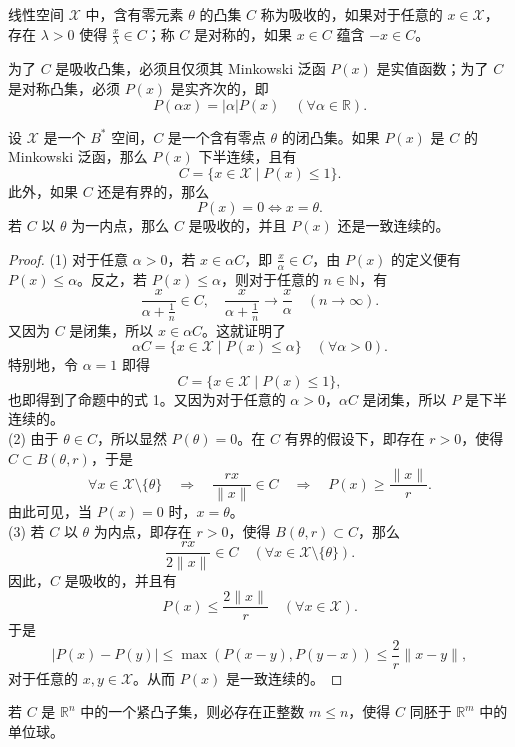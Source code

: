 \documentclass[lang=cn,newtx,10pt,scheme=chinese,thmcnt=chapter]{elegantbook}
\begin{document}
\begin{definition}
线性空间 $\mathscr{X}$ 中，含有零元素 $\theta$ 的凸集 $C$ 称为吸收的，如果对于任意的 $x \in \mathscr{X}$，存在 $\lambda > 0$ 使得 $\frac{x}{\lambda} \in C$；称 $C$ 是对称的，如果 $x \in C$ 蕴含 $-x \in C$。
\end{definition}

\begin{proposition}
为了 $C$ 是吸收凸集，必须且仅须其 Minkowski 泛函 $P(x)$ 是实值函数；为了 $C$ 是对称凸集，必须 $P(x)$ 是实齐次的，即
\[
P(\alpha x) = |\alpha| P(x) \quad (\forall \alpha \in \mathbb{R}).
\]
\end{proposition}
\begin{proposition}
设 $\mathscr{X}$ 是一个 $B^*$ 空间，$C$ 是一个含有零点 $\theta$ 的闭凸集。如果 $P(x)$ 是 $C$ 的 Minkowski 泛函，那么 $P(x)$ 下半连续，且有
\[
C = \{x \in \mathscr{X} \mid P(x) \leqslant 1\}.
\]
此外，如果 $C$ 还是有界的，那么
\[
P(x) = 0 \Longleftrightarrow x = \theta.
\]
若 $C$ 以 $\theta$ 为一内点，那么 $C$ 是吸收的，并且 $P(x)$ 还是一致连续的。
\end{proposition}

\begin{proof}
(1) 对于任意 $\alpha > 0$，若 $x \in \alpha C$，即 $\frac{x}{\alpha} \in C$，由 $P(x)$ 的定义便有 $P(x) \leqslant \alpha$。反之，若 $P(x) \leqslant \alpha$，则对于任意的 $n \in \mathbb{N}$，有
\[
\frac{x}{\alpha + \frac{1}{n}} \in C, \quad \frac{x}{\alpha + \frac{1}{n}} \rightarrow \frac{x}{\alpha} \quad (n \rightarrow \infty).
\]
又因为 $C$ 是闭集，所以 $x \in \alpha C$。这就证明了
\[
\alpha C = \{x \in \mathscr{X} \mid P(x) \leqslant \alpha\} \quad (\forall \alpha > 0).
\]
特别地，令 $\alpha = 1$ 即得
\[
C = \{x \in \mathscr{X} \mid P(x) \leqslant 1\},
\]
也即得到了命题中的式 1。又因为对于任意的 $\alpha > 0$，$\alpha C$ 是闭集，所以 $P$ 是下半连续的。\\
(2) 由于 $\theta \in C$，所以显然 $P(\theta) = 0$。在 $C$ 有界的假设下，即存在 $r > 0$，使得 $C \subset B(\theta, r)$，于是
\[
\forall x \in \mathscr{X} \setminus \{\theta\} \quad \Rightarrow \quad \frac{r x}{\|x\|} \in C \quad \Rightarrow \quad P(x) \geqslant \frac{\|x\|}{r}.
\]
由此可见，当 $P(x) = 0$ 时，$x = \theta$。\\
(3) 若 $C$ 以 $\theta$ 为内点，即存在 $r > 0$，使得 $B(\theta, r) \subset C$，那么
\[
\frac{r x}{2 \|x\|} \in C \quad (\forall x \in \mathscr{X} \setminus \{\theta\}).
\]
因此，$C$ 是吸收的，并且有
\[
P(x) \leqslant \frac{2 \|x\|}{r} \quad (\forall x \in \mathscr{X}).
\]
于是
\[
|P(x) - P(y)| \leqslant \max(P(x - y), P(y - x)) \leqslant \frac{2}{r} \|x - y\|,
\]
对于任意的 $x, y \in \mathscr{X}$。从而 $P(x)$ 是一致连续的。
\end{proof}
\begin{proposition}
若 $C$ 是 $\mathbb{R}^n$ 中的一个紧凸子集，则必存在正整数 $m \leqslant n$，使得 $C$ 同胚于 $\mathbb{R}^m$ 中的单位球。
\end{proposition}
\end{document}
